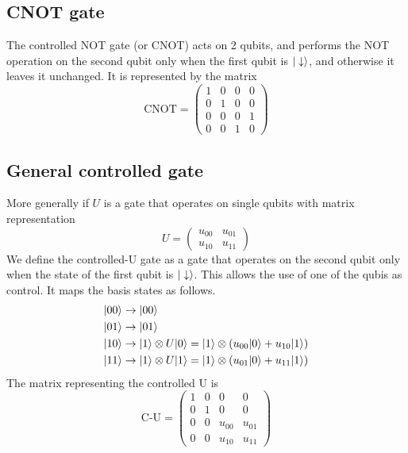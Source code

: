 \subsection{CNOT gate}
The controlled NOT gate (or CNOT) acts on 2 qubits, and performs the NOT operation on the second qubit only when the first qubit is $|\downarrow\rangle$, and otherwise it leaves it unchanged. It is represented by the matrix
\begin{equation}
  \text{CNOT} = \left(\begin{array}{cccc}
  1 & 0 & 0 & 0 \\
  0 & 1 & 0 & 0 \\
  0 & 0 & 0 & 1 \\
  0 & 0 & 1 & 0
  \end{array}\right)
\end{equation}

\subsection{General controlled gate}
More generally if $U$ is a gate that operates on single qubits with matrix representation
\begin{equation}
  U = \left(\begin{array}{cc}
  u_{00} & u_{01} \\
  u_{10} & u_{11}
  \end{array}\right)
\end{equation}
We define the controlled-U gate as a gate that operates on the second qubit only when the state of the first qubit is $|\downarrow\rangle$. This allows the use of one of the qubis as control. It maps the basis states as follows.
\begin{equation}
  \begin{split}
    &|00\rangle\rightarrow|00\rangle\\
    &|01\rangle\rightarrow|01\rangle\\
    &|10\rangle\rightarrow|1\rangle\otimes U|0\rangle=|1\rangle\otimes \left(u_{00}|0\rangle+u_{10}|1\rangle\right)\\
    &|11\rangle\rightarrow|1\rangle\otimes U|1\rangle=|1\rangle\otimes \left(u_{01}|0\rangle+u_{11}|1\rangle\right)
  \end{split}
\end{equation}
The matrix representing the controlled U is
\begin{equation}
  \text{C-U} = \left(\begin{array}{cccc}
  1 & 0 & 0 & 0 \\
  0 & 1 & 0 & 0 \\
  0 & 0 & u_{00} & u_{01} \\
  0 & 0 & u_{10} & u_{11}
  \end{array}\right)
\end{equation}

